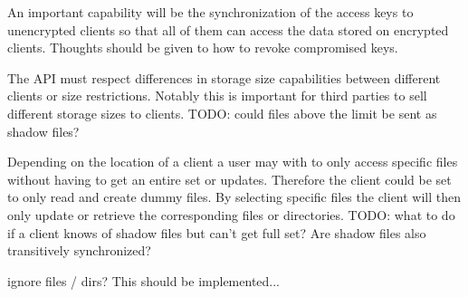 \begin{description}[leftmargin=2em,style=nextline,noitemsep,nolistsep]
\item[Encryption Key Management]
    An important capability will be the synchronization of the access keys to unencrypted clients so that all of them can access the data stored on encrypted clients.
    Thoughts should be given to how to revoke compromised keys.
\item[Space Management]
    The API must respect differences in storage size capabilities between different clients or size restrictions.
    Notably this is important for third parties to sell different storage sizes to clients.
    TODO: could files above the limit be sent as shadow files?
\item[Shadow Files]
    Depending on the location of a client a user may with to only access specific files without having to get an entire set or updates.
    Therefore the client could be set to only read and create dummy files.
    By selecting specific files the client will then only update or retrieve the corresponding files or directories.
    TODO: what to do if a client knows of shadow files but can't get full set?
    Are shadow files also transitively synchronized?
\item[Ignored Objects]
    ignore files / dirs? This should be implemented...
\end{description}
